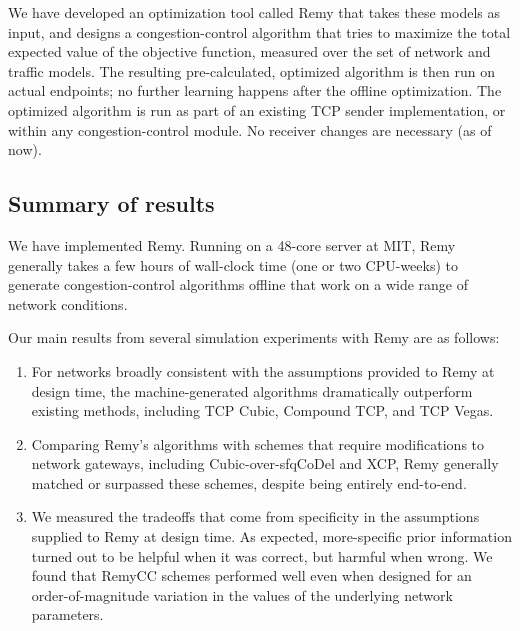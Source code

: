 We have developed an optimization tool called Remy that takes these
models as input, and designs a congestion-control algorithm that tries
to maximize the total expected value of the objective function, measured over the set of
network and traffic models. The resulting pre-calculated, optimized
algorithm is then run on actual endpoints; no further learning happens
after the offline optimization. The optimized algorithm is run as part
of an existing TCP sender implementation, or within any
congestion-control module. No receiver changes are necessary (as of
now).

\subsection*{Summary of results}

We have implemented Remy. Running on a 48-core server at MIT, Remy
generally takes a few hours of wall-clock time (one or two CPU-weeks)
to generate congestion-control algorithms offline that work on a wide
range of network conditions.

Our main results from several simulation experiments
with Remy are as follows:

\begin{enumerate}

\item For networks broadly consistent with the assumptions provided to
  Remy at design time, the machine-generated algorithms dramatically
  outperform existing methods, including TCP Cubic, Compound TCP, and
  TCP Vegas.

\item Comparing Remy's algorithms with schemes that require
  modifications to network gateways, including Cubic-over-sfqCoDel and
  XCP, Remy generally matched or surpassed these schemes, despite
  being entirely end-to-end.

\item We measured the tradeoffs that come from specificity in the
  assumptions supplied to Remy at design time. As expected,
  more-specific prior information turned out to be helpful when it was
  correct, but harmful when wrong. We found that RemyCC schemes
  performed well even when designed for an order-of-magnitude
  variation in the values of the underlying network parameters.
\end{enumerate}


